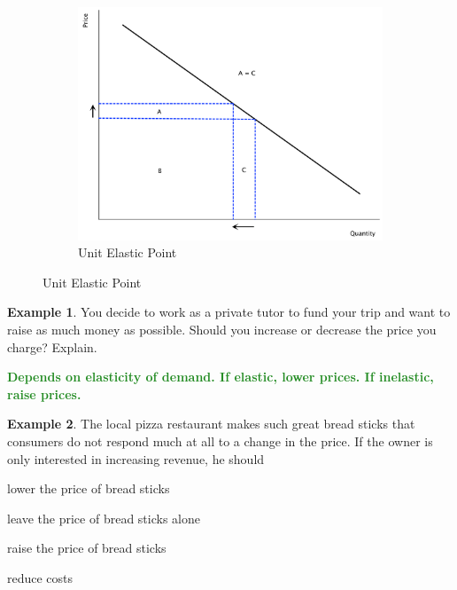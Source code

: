 \documentclass[11pt]{article}\usepackage[]{graphicx}\usepackage[]{color}
\theoremstyle{definition}
\newtheorem{exmp}{Example}[section]
\newcommand{\blank}[1]{}
\newcommand{\ddp}[1]{{\textbf{\textcolor{ForestGreen}{#1}}}}
\begin{document}
\begin{figure}[H]
			\begin{subfigure}{.3\textwidth}
				\centering
				\includegraphics[scale=.3]{plot28.pdf}
				\caption{Unit Elastic Point}
			\end{subfigure}
		\end{figure}
	
	\begin{exmp}
		You decide to work as a private tutor to fund your trip and want to raise as much money as possible. Should you increase or decrease the price you charge? Explain.
	\end{exmp} 
	\blank{}
	\ddp{Depends on elasticity of demand. If elastic, lower prices. If inelastic, raise prices.}

	
	\begin{exmp} 
		The local pizza restaurant makes such great bread sticks that consumers do not respond much at all to a change in the price. If the owner is only interested in increasing revenue, he should
	
	\begin{enumerate}[(a)]
		{\setlength\itemindent{25pt} \item lower the price of bread sticks}
		{\setlength\itemindent{25pt} \item leave the price of bread sticks alone}
		{\setlength\itemindent{25pt} \item raise the price of bread sticks}
		{\setlength\itemindent{25pt} \item reduce costs}
	\end{enumerate}	
	\end{exmp}
	
\end{document}
